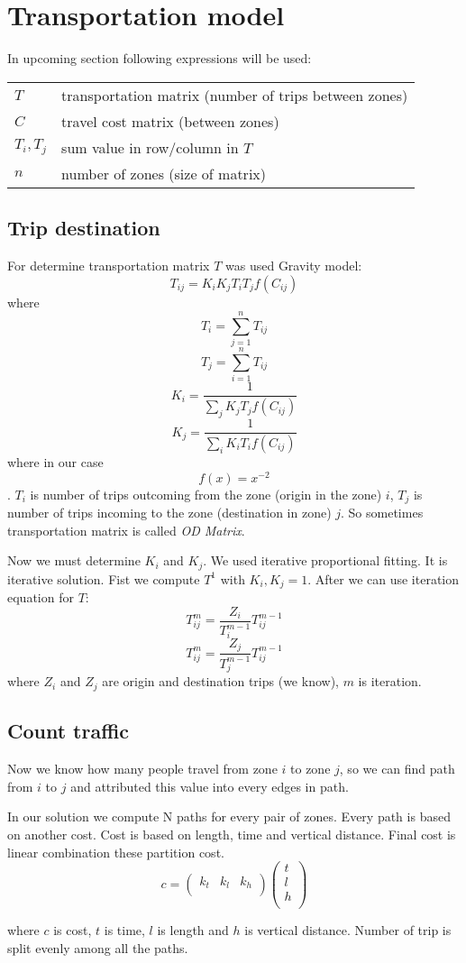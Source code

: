 \section{Transportation model}
In upcoming section following expressions will be used:

\begin{tabular}{ll}
$T$ & transportation matrix (number of trips between zones)\\
$C$ & travel cost matrix (between zones) \\
$T_i, T_j$ & sum value in row/column in $T$\\
$n$ & number of zones (size of matrix)
\end{tabular}

\subsection{Trip destination}

For determine transportation matrix $T$ was used Gravity model:
$$T_{ij} = K_i K_j T_i T_j f(C_{ij})$$
where
$$T_i = \sum_{j = 1}^{n} T_{ij}$$
$$T_j = \sum_{i = 1}^{n} T_{ij}$$
$$K_i = \frac{1}{\sum_{j} K_j T_j f(C_{ij})}$$
$$K_j = \frac{1}{\sum_{i} K_i T_i f(C_{ij})}$$
where in our case $$f(x) = x^{-2}$$.
$T_i$ is number of trips outcoming from the zone (origin in the zone) $i$, $T_j$ is number of trips incoming to the zone (destination in zone) $j$. So sometimes transportation matrix is called \textit{OD Matrix}. 

Now we must determine $K_i$ and $K_j$. We used iterative proportional fitting. It is iterative solution. Fist we compute $T^1$ with $K_i, K_j = 1$. After we can use iteration equation for $T$:
$$T_{ij}^{m} = \frac{Z_i}{T_i^{m-1}} T_{ij}^{m-1}$$
$$T_{ij}^{m} = \frac{Z_j}{T_j^{m-1}} T_{ij}^{m-1}$$
where $Z_i$ and $Z_j$ are origin and destination trips (we know), $m$ is iteration.

\subsection{Count traffic}
Now we know how many people travel from zone $i$ to zone $j$, so we can find path from $i$ to $j$ and 
attributed this value into every edges in path.

In our solution we compute N paths for every pair of zones. Every path is based on another cost. Cost is based on length, time and vertical distance. Final cost is linear combination these partition cost.
$$c = \left(\begin{array}{ccc}
k_t & k_l & k_h\\
\end{array}\right) \left( \begin{array}{c}
t\\
l\\
h\\
\end{array} \right)$$

where $c$ is cost, $t$ is time, $l$ is length and $h$ is vertical distance. Number of trip is split evenly among all the paths.